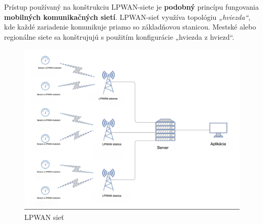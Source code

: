 \documentclass[11pt]{article}
\begin{document}
Prístup používaný na konštrukciu LPWAN-siete je \textbf{podobný} princípu fungovania \textbf{mobilných komunikačných sietí}. LPWAN-sieť využíva topológiu \textit{„hviezda“}, kde každé zariadenie komunikuje priamo so základňovou stanicou. Mestské alebo regionálne siete sa konštrujujú s použitím konfigurácie „hviezda z hviezd“.

\begin{figure}
    \centering
    \includegraphics[width=0.5\linewidth]{LPWAN_pc1.png}
    \caption{LPWAN sieť}
    \label{fig:pc1}
\end{figure}
\end{document}
